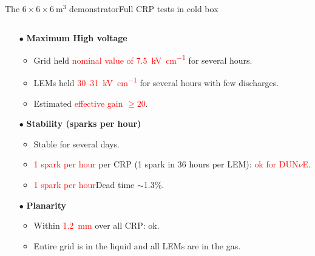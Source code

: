 \documentclass[10pt]{beamer}
\begin{document}
\begin{frame}{The \texorpdfstring{$6 \times 6 \times \SI{6}{\meter\cubed}$}{666} demonstrator}{Full CRP tests in cold box}
\begin{columns}
\begin{column}{0.6\textwidth}
\begin{scriptsize}
	    			\begin{itemize}
	    				\item[$\bullet$] \textbf{Maximum High voltage}
	    				\begin{itemize}
	    					\item Grid held \textcolor{red}{nominal value of \SI{7.5}{\kilo\volt\per\centi\meter}} for several hours.
	    					\item LEMs held \textcolor{red}{30--\SI{31}{\kilo\volt\per\centi\meter}} for several hours with few discharges.
	    					\item Estimated \textcolor{red}{effective gain $\geq20$}.
	    				\end{itemize}
	    				\item[$\bullet$] \textbf{Stability (sparks per hour)}
	    				\begin{itemize}
	    					\item Stable for several days.
	    					\item \textcolor{red}{1 spark per hour} per CRP (1 spark in 36 hours per LEM): \textcolor{red}{ok for DUN$\nu$E}.
	    					\item \textcolor{red}{1 spark per hour}{Dead time $\sim$1.3\%}.
	    				\end{itemize}
	    				\item[$\bullet$] \textbf{Planarity}
	    				\begin{itemize}
	    					\item Within \textcolor{red}{\SI{1.2}{\milli\meter}} over all CRP: ok.
	    					\item Entire grid is in the liquid and all LEMs are in the gas.
	    				\end{itemize}
	    			\end{itemize}
	    		\end{scriptsize}

\end{column}
\end{columns}
\end{frame}
\end{document}
